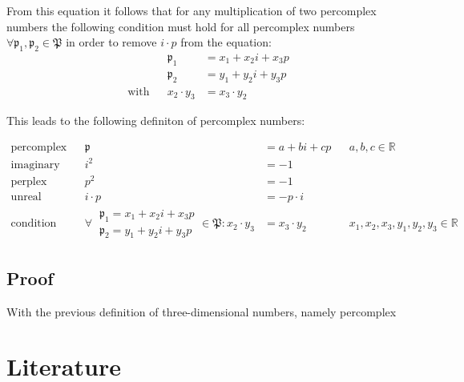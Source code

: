 \documentclass[a4paper,english,parskip]{scrartcl}
\begin{document}
From this equation it follows that for any multiplication of two percomplex numbers
the following condition must hold for all percomplex numbers $\forall \mathfrak{p}_1, \mathfrak{p}_2  \in \mathfrak{P}$ in order to remove $i \cdot p$ from the equation:
\begin{align*} 
&&  \mathfrak{p}_1 &= x_1 + x_2i + x_3p \\
&& \mathfrak{p}_2 &= y_1 + y_2i + y_3p \\
 \text{with} && x_2 \cdot y_3 &= x_3 \cdot y_2
\end{align*}

This leads to the following definiton of percomplex numbers:

\begin{tcolorbox}[title=Percomplex Numbers,colframe=blue!60, colback=blue!5]
\vspace{-20pt}
\begin{align*}
\text{percomplex number} && \mathfrak{p} &= a + bi + cp && a,b,c \in \mathbb{R} \\
\text{imaginary unit} && i^2 &= -1 \\
\text{perplex unit} && p^2 &= -1 \\
\text{unreal product} && i \cdot p &= - p \cdot i \\
\text{condition} && \forall \hspace{3pt} \substack{\mathfrak{p}_1=x_1 + x_2i + x_3p \\ \mathfrak{p}_2=y_1 + y_2i + y_3p}  \in \mathfrak{P}: x_2 \cdot y_3 &= x_3 \cdot y_2 && x_1,x_2,x_3, y_1,y_2,y_3 \in \mathbb{R}
\end{align*}
\end{tcolorbox}

\subsection{Proof}

With the previous definition of three-dimensional numbers, namely percomplex


	
	\newpage
	\section{Literature}
	
	
	\printbibliography[type=article, title={Articles}]
	\printbibliography[type=thesis, title={Papers}]
	\printbibliography[type=inbook, title={Book Excerpts}]
	\printbibliography[type=inproceedings, title={Inproceedings}]
	
\end{document}

